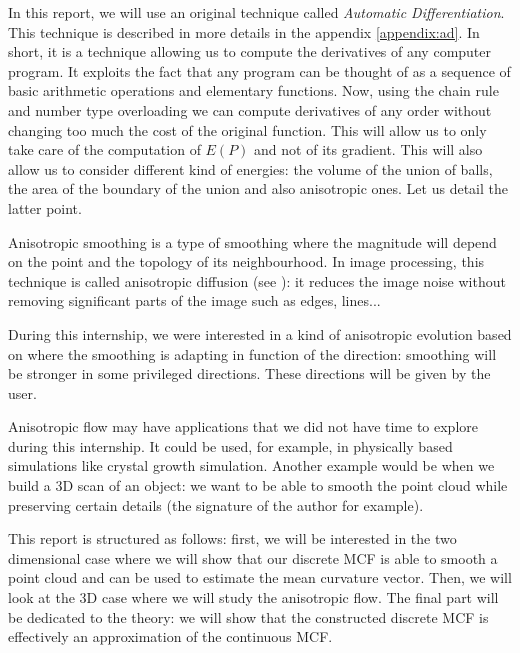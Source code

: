 In this report, we will use an original technique called \textit{Automatic
    Differentiation}. This technique is described in more details in the
appendix \ref{appendix:ad}. In short, it is a technique allowing us to compute
the derivatives of any computer program. It exploits the fact that any program
can be thought of as a sequence of basic arithmetic operations and elementary
functions. Now, using the chain rule and number type overloading we can compute
derivatives of any order without changing too much the cost of the original
function.  This will allow us to only take care of the computation of $ E(P) $
and not of its gradient. This will also allow us to consider different kind of
energies: the volume of the union of balls, the area of the boundary of the
union and also anisotropic ones. Let us detail the latter point.

Anisotropic smoothing is a type of smoothing where the magnitude will depend on
the point and the topology of its neighbourhood. In image processing, this
technique is called anisotropic diffusion (see \cite{weickert1998anisotropic}):
it reduces the image noise without removing significant parts of the image such
as edges, lines...

During this internship, we were interested in a kind of anisotropic evolution
based on \cite{chambolle2012nonlocal} where the smoothing is adapting in
function of the direction: smoothing will be stronger in some privileged
directions. These directions will be given by the user.

Anisotropic flow may have applications that we did not have time to explore
during this internship. It could be used, for example, in physically based
simulations like crystal growth simulation. Another example would be when we
build a 3D scan of an object: we want to be able to smooth the point cloud while
preserving certain details (the signature of the author for example).

This report is structured as follows: first, we will be interested in the two
dimensional case where we will show that our discrete MCF is able to smooth a
point cloud and can be used to estimate the mean curvature vector. Then, we will
look at the 3D case where we will study the anisotropic flow. The final part
will be dedicated to the theory: we will show that the constructed discrete MCF
is effectively an approximation of the continuous MCF.


